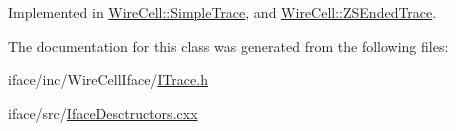 Implemented in \hyperlink{class_wire_cell_1_1_simple_trace_a0a345e3606f66b64b2dbb00df7664210}{Wire\+Cell\+::\+Simple\+Trace}, and \hyperlink{class_wire_cell_1_1_z_s_ended_trace_ac0ae929485ed907726568f02193e931f}{Wire\+Cell\+::\+Z\+S\+Ended\+Trace}.



The documentation for this class was generated from the following files\+:\begin{DoxyCompactItemize}
\item 
iface/inc/\+Wire\+Cell\+Iface/\hyperlink{_i_trace_8h}{I\+Trace.\+h}\item 
iface/src/\hyperlink{_iface_desctructors_8cxx}{Iface\+Desctructors.\+cxx}\end{DoxyCompactItemize}
